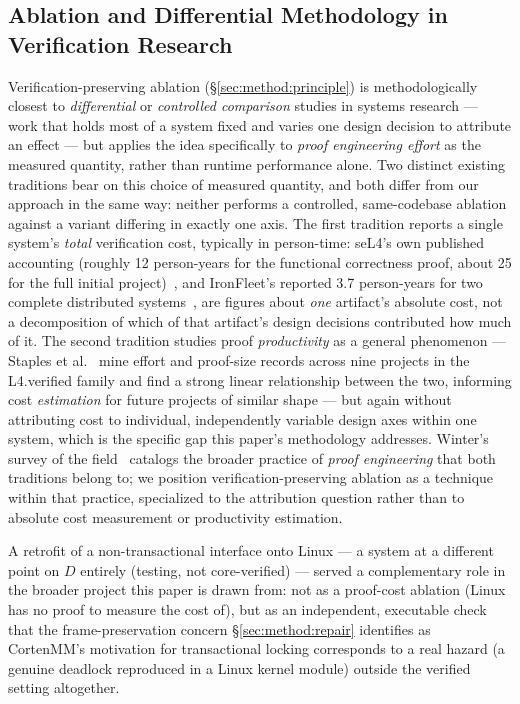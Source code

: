 \documentclass[10pt]{article}
\begin{document}
\subsection{Ablation and Differential Methodology in Verification
Research}
\label{sec:related:methodology}

Verification-preserving ablation (\S\ref{sec:method:principle}) is
methodologically closest to \emph{differential} or \emph{controlled
comparison} studies in systems research --- work that holds most of a
system fixed and varies one design decision to attribute an effect ---
but applies the idea specifically to \emph{proof engineering effort} as
the measured quantity, rather than runtime performance alone. Two
distinct existing traditions bear on this choice of measured quantity,
and both differ from our approach in the same way: neither performs a
controlled, same-codebase ablation against a variant differing in
exactly one axis. The first tradition reports a single system's
\emph{total} verification cost, typically in person-time: seL4's own
published accounting (roughly 12 person-years for the functional
correctness proof, about 25 for the full initial
project)~\cite{sel4-proof-eng}, and IronFleet's reported 3.7
person-years for two complete distributed
systems~\cite{ironfleet}, are figures about \emph{one} artifact's
absolute cost, not a decomposition of which of that artifact's design
decisions contributed how much of it. The second tradition studies
proof \emph{productivity} as a general phenomenon --- Staples et
al.~\cite{proof-productivity} mine effort and proof-size records across
nine projects in the L4.verified family and find a strong linear
relationship between the two, informing cost \emph{estimation} for
future projects of similar shape --- but again without attributing
cost to individual, independently variable design axes within one
system, which is the specific gap this paper's methodology addresses.
Winter's survey of the field~\cite{qed-at-large} catalogs the broader
practice of \emph{proof engineering} that both traditions belong to; we
position verification-preserving ablation as a technique within that
practice, specialized to the attribution question rather than to
absolute cost measurement or productivity estimation.

A retrofit of a non-transactional interface onto Linux --- a system at a
different point on $D$ entirely (testing, not core-verified) --- served
a complementary role in the broader project this paper is drawn from:
not as a proof-cost ablation (Linux has no proof to measure the cost
of), but as an independent, executable check that the
frame-preservation concern \S\ref{sec:method:repair} identifies as
CortenMM's motivation for transactional locking corresponds to a real
hazard (a genuine deadlock reproduced in a Linux kernel module) outside
the verified setting altogether.
\end{document}
